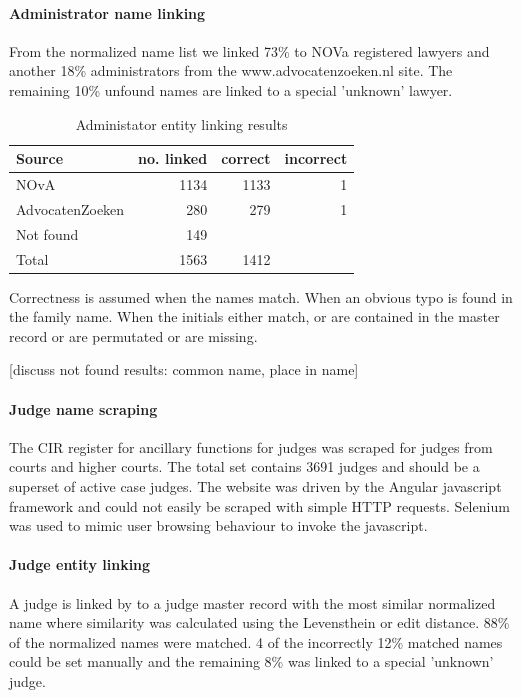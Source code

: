 \paragraph{Administrator name linking}
From the normalized name list we linked 73\% to NOVa registered lawyers and another 18\% administrators from the www.advocatenzoeken.nl site. The remaining 10\% unfound names are linked to a special 'unknown' lawyer.

\begin{table}[h]
\caption{Administator entity linking results}
\centering
\begin{tabular}{l r r r}
\hline\hline
Source & no. linked & correct & incorrect\\
\hline
NOvA & 1134 & 1133 & 1\\
AdvocatenZoeken & 280 & 279 & 1 \\
Not found & 149 &&\\
\hline
Total & 1563 & 1412 &\\
\hline
\end{tabular}
\label{table:administrator_linking}
\end{table}

Correctness is assumed when the names match. When an obvious typo is found in the family name. When the initials either match, or are contained in the master record or are permutated or are missing. 

[discuss not found results: common name, place in name]

\paragraph{Judge name scraping}
The CIR register for ancillary functions for judges was scraped for judges from courts and higher courts. The total set contains 3691 judges and should be a superset of active case judges. The website was driven by the Angular javascript framework and could not easily be scraped with simple HTTP requests. Selenium was used to mimic user browsing behaviour to invoke the javascript. 

\paragraph{Judge entity linking}
A judge is linked by to a judge master record with the most similar normalized name where similarity was calculated using the Levensthein or edit distance. 88\% of the normalized names were matched. 4 of the incorrectly 12\% matched names could be set manually and the remaining 8\% was linked to a special 'unknown' judge.


